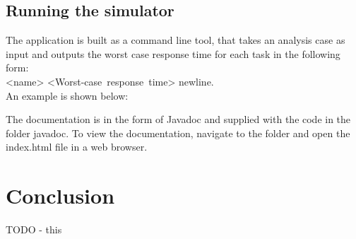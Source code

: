 \documentclass{acm_proc_article-sp}
\begin{document}
\subsection{Running the simulator}
The application is built as a command line tool, that takes an analysis case as input and outputs the worst case response time for each task in the following form:\\ <name> <Worst-case~response~time> newline.\\ An example is shown below:



The documentation is in the form of Javadoc and supplied with the code in the folder javadoc. To view the documentation, navigate to the folder and open the index.html file in a web browser.

\section{Conclusion}
\label{sec:conclusion}
%
TODO - this

%



\appendix



%
%


\end{document}
